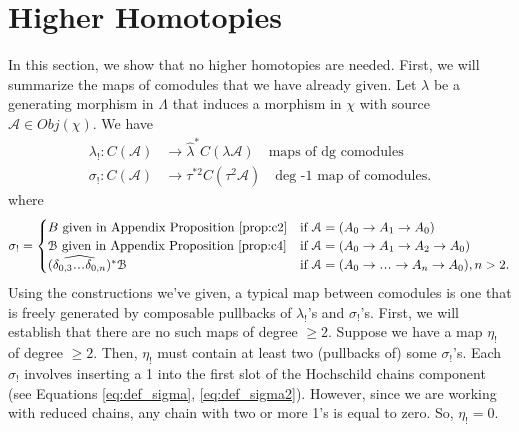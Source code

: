 \section{Higher Homotopies}
\label{sec:higher_homotopies}
In this section, we show 
that no higher homotopies are needed. 
First, we will summarize the 
maps of comodules that we have 
already given. Let $\lambda$ be a 
generating morphism in $\Lambda$ 
that induces a morphism in $\chi$ with 
source $\mathcal{A}\in Obj(\chi)$. We have 
\begin{align*}
\lambda_!: C(\mathcal{A})
&\to 
\hat{\lambda}^*C(\lambda\mathcal{A})
  \quad \textrm{maps of dg comodules}\\
\sigma_!:
  C(\mathcal{A}) 
&\to 
\tau^{*2}C(\tau^2\mathcal{A})
  \quad \textrm{deg -1 map of comodules.}
\end{align*}
where
\begin{align*}
\sigma_!
=
\begin{cases}
B \textrm{ given in Appendix Proposition 
  \ref{prop:c2}}
  & \textrm{if } 
  \mathcal{A} = (A_0 \to A_1 \to A_0)\\
\mathcal{B} \textrm{ given in Appendix 
  Proposition \ref{prop:c4}}
  &  \textrm{if } 
  \mathcal{A} = (A_0 \to A_1 \to A_2 \to A_0)\\
(\widehat{\delta_{0,3}\smdots\delta_{0,n}})^*
  \mathcal{B}
  & \textrm{if } 
  \mathcal{A} = (A_0 \to \smdots \to A_n \to A_0), 
  n>2.
\end{cases}
\end{align*}
Using the constructions we've given, 
a typical map between comodules is 
one that is freely generated by composable 
pullbacks of $\lambda_!$'s and $\sigma_!$'s. 
First, we will establish that there are 
no such maps of degree $\geq2$. Suppose 
we have a map $\eta_!$ of degree 
$\geq2$. Then, $\eta_!$ must contain at 
least two (pullbacks of) some $\sigma_!$'s. 
Each $\sigma_!$ involves inserting a 1 
into the first slot of the Hochschild 
chains component (see Equations 
\ref{eq:def_sigma}, \ref{eq:def_sigma2}). 
However, since we are working with 
reduced chains, any chain with two or 
more 1's is equal to zero. So, 
$\eta_! = 0$.


